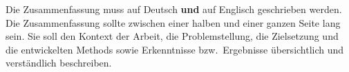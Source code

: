 

Die Zusammenfassung muss auf Deutsch \textbf{und} auf Englisch geschrieben
werden. Die Zusammenfassung sollte zwischen einer halben und einer
ganzen Seite lang sein. Sie soll den Kontext der Arbeit, die
Problemstellung, die Zielsetzung und die entwickelten Methods sowie
Erkenntnisse bzw.~Ergebnisse übersichtlich und verständlich
beschreiben.

